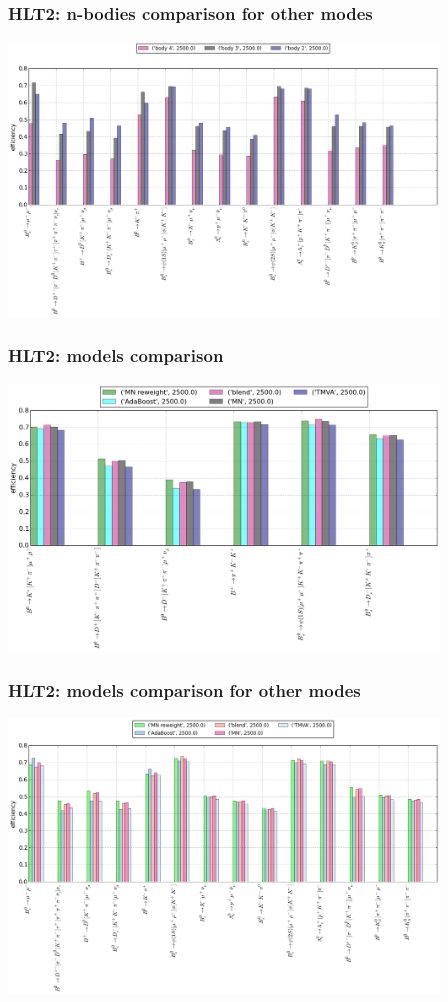\documentclass[xcolor=svgnames]{beamer}
\begin{document}
\begin{frame}\frametitle{HLT2: n-bodies comparison for other modes}
\includegraphics[width=4.5in]{images/hlt_body.png}
\end{frame}

\begin{frame}\frametitle{HLT2: models comparison}
\includegraphics[width=4.5in]{images/blend.png}
\end{frame}

\begin{frame}\frametitle{HLT2: models comparison for other modes}
\includegraphics[width=4.5in]{images/hlt_mns.png}
\end{frame}
\end{document}
